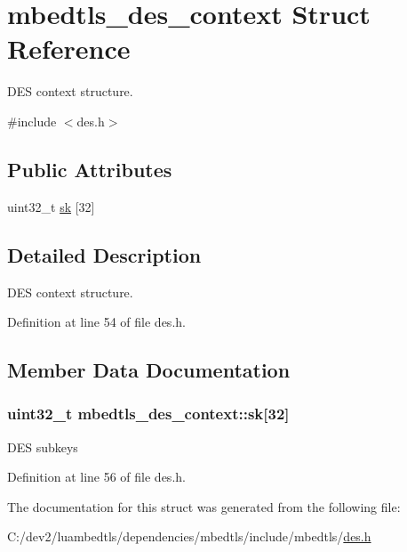 \hypertarget{structmbedtls__des__context}{\section{mbedtls\-\_\-des\-\_\-context Struct Reference}
\label{structmbedtls__des__context}
}


D\-E\-S context structure.  




{\ttfamily \#include $<$des.\-h$>$}

\subsection*{Public Attributes}
\begin{DoxyCompactItemize}
\item 
uint32\-\_\-t \hyperlink{structmbedtls__des__context_a964fb6a2eb38c2bdcd9ff1ac42b9378c}{sk} \mbox{[}32\mbox{]}
\end{DoxyCompactItemize}


\subsection{Detailed Description}
D\-E\-S context structure. 

Definition at line 54 of file des.\-h.



\subsection{Member Data Documentation}
\hypertarget{structmbedtls__des__context_a964fb6a2eb38c2bdcd9ff1ac42b9378c}{
\subsubsection[{sk}]{\setlength{\rightskip}{0pt plus 5cm}uint32\-\_\-t mbedtls\-\_\-des\-\_\-context\-::sk\mbox{[}32\mbox{]}}}\label{structmbedtls__des__context_a964fb6a2eb38c2bdcd9ff1ac42b9378c}
D\-E\-S subkeys 

Definition at line 56 of file des.\-h.



The documentation for this struct was generated from the following file\-:\begin{DoxyCompactItemize}
\item 
C\-:/dev2/luambedtls/dependencies/mbedtls/include/mbedtls/\hyperlink{des_8h}{des.\-h}\end{DoxyCompactItemize}
